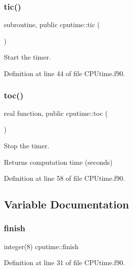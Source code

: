 \subsubsection{\texorpdfstring{tic()}{tic()}}
{\footnotesize\ttfamily subroutine, public cputime\+::tic (\begin{DoxyParamCaption}{ }\end{DoxyParamCaption})}



Start the timer. 



Definition at line 44 of file C\+P\+Utime.\+f90.

\mbox{\label{namespacecputime_a6c69d406a4397d16ea918e4eb035fde9}} 
\subsubsection{\texorpdfstring{toc()}{toc()}}
{\footnotesize\ttfamily real function, public cputime\+::toc (\begin{DoxyParamCaption}{ }\end{DoxyParamCaption})}



Stop the timer. 

\begin{DoxyReturn}{Returns}
computation time (seconds) 
\end{DoxyReturn}


Definition at line 58 of file C\+P\+Utime.\+f90.



\subsection{Variable Documentation}
\mbox{\label{namespacecputime_ad2d439f12d6051a89b5ba23d52aa3e4f}} 
\subsubsection{\texorpdfstring{finish}{finish}}
{\footnotesize\ttfamily integer(8) cputime\+::finish\hspace{0.3cm}{\ttfamily [private]}}



Definition at line 31 of file C\+P\+Utime.\+f90.

